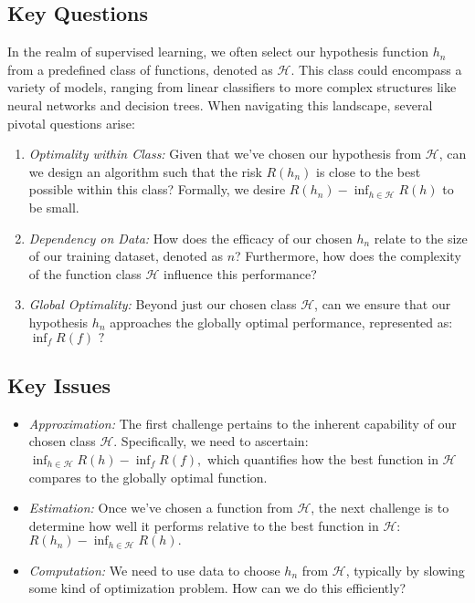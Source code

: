 \documentclass[11pt]{article}
\begin{document}
    \subsection{Key Questions}

    In the realm of supervised learning, we often select our hypothesis function $h_n$ from a predefined class of functions, denoted as $\mathcal{H}$. This class could encompass a variety of models, ranging from linear classifiers to more complex structures like neural networks and decision trees. When navigating this landscape, several pivotal questions arise:

    \begin{enumerate}
        \item \textit{Optimality within Class:} Given that we've chosen our hypothesis from $\mathcal{H}$, can we design an algorithm such that the risk $R(h_n)$ is close to the best possible within this class? Formally, we desire $R(h_n) - \inf_{h \in \mathcal{H}} R(h)$ to be small.

        \item \textit{Dependency on Data:} How does the efficacy of our chosen $h_n$ relate to the size of our training dataset, denoted as $n$? Furthermore, how does the complexity of the function class $\mathcal{H}$ influence this performance?

        \item \textit{Global Optimality:} Beyond just our chosen class $\mathcal{H}$, can we ensure that our hypothesis $h_n$ approaches the globally optimal performance, represented as:
        $\inf_{f} R(f) \text{ ?}$
    \end{enumerate}

    \subsection{Key Issues}

    \begin{itemize}
        \item \textit{Approximation:} The first challenge pertains to the inherent capability of our chosen class $\mathcal{H}$. Specifically, we need to ascertain:
        $
        \inf_{h \in \mathcal{H}} R(h) - \inf_{f} R(f),
        $
        which quantifies how the best function in $\mathcal{H}$ compares to the globally optimal function.

        \item \textit{Estimation:} Once we've chosen a function from $\mathcal{H}$, the next challenge is to determine how well it performs relative to the best function in $\mathcal{H}$:
        $
        R(h_n) - \inf_{h \in \mathcal{H}} R(h).
        $

        \item \textit{Computation:} We need to use data to choose $h_n$ from $\mathcal{H}$, typically by slowing some kind of optimization problem. How can we do this efficiently?
    \end{itemize}
\end{document}

